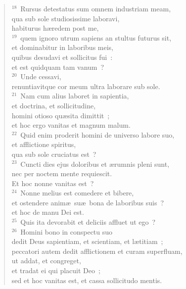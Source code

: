 \begin{verse}${}^{18}$~Rursus detestatus sum omnem industriam meam,\\ qua sub sole studiosissime laboravi,\\ habiturus h\ae redem post me,\\
${}^{19}$~quem ignoro utrum sapiens an stultus futurus sit,\\ et dominabitur in laboribus meis,\\ quibus desudavi et sollicitus fui~:\\ et est quidquam tam vanum~?\\
${}^{20}$~Unde cessavi,\\ renuntiavitque cor meum ultra laborare sub sole.\\
${}^{21}$~Nam cum alius laboret in sapientia,\\ et doctrina, et sollicitudine,\\ homini otioso qu\ae sita dimittit~;\\ et hoc ergo vanitas et magnum malum.\\
${}^{22}$~Quid enim proderit homini de universo labore suo,\\ et afflictione spiritus,\\ qua sub sole cruciatus est~?\\
${}^{23}$~Cuncti dies ejus doloribus et \ae rumnis pleni sunt,\\ nec per noctem mente requiescit.\\ Et hoc nonne vanitas est~?\\
${}^{24}$~Nonne melius est comedere et bibere,\\ et ostendere anim\ae\ su\ae\ bona de laboribus suis~?\\ et hoc de manu Dei est.\\
${}^{25}$~Quis ita devorabit et deliciis affluet ut ego~?\\
${}^{26}$~Homini bono in conspectu suo\\ dedit Deus sapientiam, et scientiam, et l\ae titiam~;\\ peccatori autem dedit afflictionem et curam superfluam,\\ ut addat, et congreget,\\ et tradat ei qui placuit Deo~;\\ sed et hoc vanitas est, et cassa sollicitudo mentis.\end{verse}


